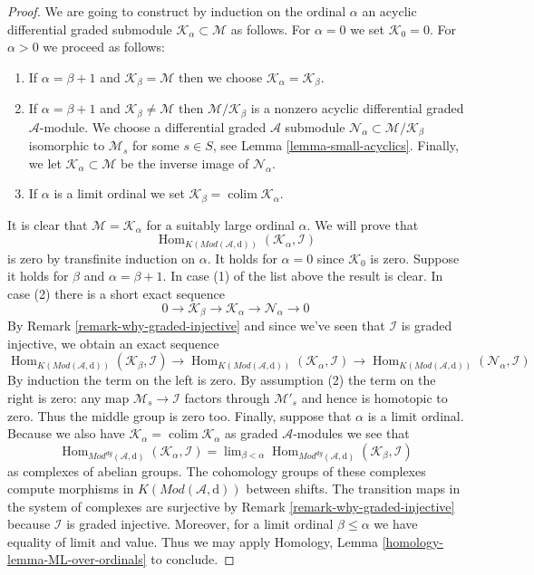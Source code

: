 \documentclass[10pt,a4paper]{amsart}
\theoremstyle{plain}
\theoremstyle{definition}
\theoremstyle{remark}
\numberwithin{equation}{subsection}
\def\lim{\mathop{\mathrm{lim}}\nolimits}
\def\colim{\mathop{\mathrm{colim}}\nolimits}
\def\Hom{\mathop{\mathrm{Hom}}\nolimits}
\begin{document}
\begin{proof}
\medskip\noindent
We are going to construct by induction on the ordinal $\alpha$
an acyclic differential graded submodule
$\mathcal{K}_\alpha \subset \mathcal{M}$ as follows.
For $\alpha = 0$ we set $\mathcal{K}_0 = 0$. For $\alpha > 0$
we proceed as follows:
\begin{enumerate}
\item If $\alpha = \beta + 1$ and $\mathcal{K}_\beta = \mathcal{M}$
then we choose $\mathcal{K}_\alpha = \mathcal{K}_\beta$.
\item If $\alpha = \beta + 1$ and $\mathcal{K}_\beta \not = \mathcal{M}$
then $\mathcal{M}/\mathcal{K}_\beta$ is a nonzero acyclic
differential graded $\mathcal{A}$-module.
We choose a differential graded $\mathcal{A}$ submodule
$\mathcal{N}_\alpha \subset \mathcal{M}/\mathcal{K}_\beta$
isomorphic to $\mathcal{M}_s$ for some $s \in S$, see
Lemma \ref{lemma-small-acyclics}.
Finally, we let $\mathcal{K}_\alpha \subset \mathcal{M}$
be the inverse image of $\mathcal{N}_\alpha$.
\item If $\alpha$ is a limit ordinal we set
$\mathcal{K}_\beta = \colim \mathcal{K}_\alpha$.
\end{enumerate}
It is clear that $\mathcal{M} = \mathcal{K}_\alpha$ for a suitably large
ordinal $\alpha$. We will prove that
$$
\Hom_{K(\textit{Mod}(\mathcal{A}, \text{d}))}(\mathcal{K}_\alpha, \mathcal{I})
$$
is zero by transfinite induction on $\alpha$. It holds for $\alpha = 0$
since $\mathcal{K}_0$ is zero. Suppose it holds for $\beta$ and
$\alpha = \beta + 1$. In case (1) of the list above the result is clear.
In case (2) there is a short exact sequence
$$
0 \to \mathcal{K}_\beta \to \mathcal{K}_\alpha \to \mathcal{N}_\alpha \to 0
$$
By Remark \ref{remark-why-graded-injective}
and since we've seen that $\mathcal{I}$ is graded
injective, we obtain an exact sequence
$$
\Hom_{K(\textit{Mod}(\mathcal{A}, \text{d}))}(\mathcal{K}_\beta, \mathcal{I})
\to
\Hom_{K(\textit{Mod}(\mathcal{A}, \text{d}))}(\mathcal{K}_\alpha, \mathcal{I})
\to
\Hom_{K(\textit{Mod}(\mathcal{A}, \text{d}))}(\mathcal{N}_\alpha, \mathcal{I})
$$
By induction the term on the left is zero. By assumption (2)
the term on the right is zero: any map $\mathcal{M}_s \to \mathcal{I}$
factors through $\mathcal{M}'_s$ and hence is homotopic to zero.
Thus the middle group is zero too. Finally, suppose that $\alpha$ is a
limit ordinal. Because we also have
$\mathcal{K}_\alpha = \colim \mathcal{K}_\alpha$ as graded
$\mathcal{A}$-modules we see that
$$
\Hom_{\textit{Mod}^{dg}(\mathcal{A}, \text{d})}
(\mathcal{K}_\alpha, \mathcal{I})
= \lim_{\beta < \alpha}
\Hom_{\textit{Mod}^{dg}(\mathcal{A}, \text{d})}
(\mathcal{K}_\beta, \mathcal{I})
$$
as complexes of abelian groups. The cohomology groups of these
complexes compute morphisms in $K(\textit{Mod}(\mathcal{A}, \text{d}))$
between shifts. The transition maps in the system of complexes
are surjective by Remark \ref{remark-why-graded-injective}
because $\mathcal{I}$ is graded injective.
Moreover, for a limit ordinal $\beta \leq \alpha$
we have equality of limit and value. Thus we may apply
Homology, Lemma \ref{homology-lemma-ML-over-ordinals}
to conclude.
\end{proof}
\end{document}
